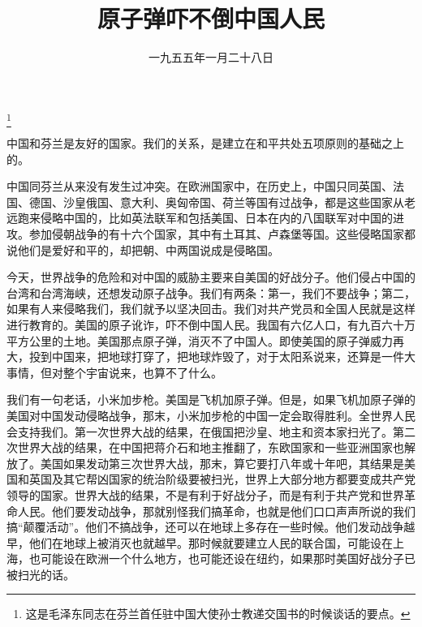 
\title{原子弹吓不倒中国人民}
\date{一九五五年一月二十八日}
\thanks{这是毛泽东同志在芬兰首任驻中国大使孙士教递交国书的时候谈话的要点。}
\maketitle


中国和芬兰是友好的国家。我们的关系，是建立在和平共处五项原则的基础之上的。

中国同芬兰从来没有发生过冲突。在欧洲国家中，在历史上，中国只同英国、法国、德国、沙皇俄国、意大利、奥匈帝国、荷兰等国有过战争，都是这些国家从老远跑来侵略中国的，比如英法联军和包括美国、日本在内的八国联军对中国的进攻。参加侵朝战争的有十六个国家，其中有土耳其、卢森堡等国。这些侵略国家都说他们是爱好和平的，却把朝、中两国说成是侵略国。

今天，世界战争的危险和对中国的威胁主要来自美国的好战分子。他们侵占中国的台湾和台湾海峡，还想发动原子战争。我们有两条：第一，我们不要战争；第二，如果有人来侵略我们，我们就予以坚决回击。我们对共产党员和全国人民就是这样进行教育的。美国的原子讹诈，吓不倒中国人民。我国有六亿人口，有九百六十万平方公里的土地。美国那点原子弹，消灭不了中国人。即使美国的原子弹威力再大，投到中国来，把地球打穿了，把地球炸毁了，对于太阳系说来，还算是一件大事情，但对整个宇宙说来，也算不了什么。

我们有一句老话，小米加步枪。美国是飞机加原子弹。但是，如果飞机加原子弹的美国对中国发动侵略战争，那末，小米加步枪的中国一定会取得胜利。全世界人民会支持我们。第一次世界大战的结果，在俄国把沙皇、地主和资本家扫光了。第二次世界大战的结果，在中国把蒋介石和地主推翻了，东欧国家和一些亚洲国家也解放了。美国如果发动第三次世界大战，那末，算它要打八年或十年吧，其结果是美国和英国及其它帮凶国家的统治阶级要被扫光，世界上大部分地方都要变成共产党领导的国家。世界大战的结果，不是有利于好战分子，而是有利于共产党和世界革命人民。他们要发动战争，那就别怪我们搞革命，也就是他们口口声声所说的我们搞“颠覆活动”。他们不搞战争，还可以在地球上多存在一些时候。他们发动战争越早，他们在地球上被消灭也就越早。那时候就要建立人民的联合国，可能设在上海，也可能设在欧洲一个什么地方，也可能还设在纽约，如果那时美国好战分子已被扫光的话。
